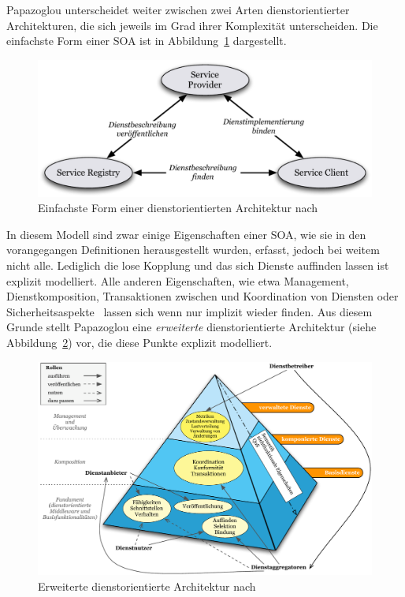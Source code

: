   Papazoglou unterscheidet weiter zwischen zwei Arten dienstorientierter Architekturen, die sich jeweils im Grad ihrer Komplexität unterscheiden. Die einfachste Form einer SOA ist in Abbildung~\ref{fig:images_Basic_SOA} dargestellt.

  \begin{figure}[!ht]
    \centering
      \includegraphics[width=.9\textwidth]{images/Basic_SOA.pdf}
    \caption{Einfachste Form einer dienstorientierten Architektur nach~\citep{service_oriented_computing}}
    \label{fig:images_Basic_SOA}
  \end{figure}

  In diesem Modell sind zwar einige Eigenschaften einer SOA, wie sie in den vorangegangen Definitionen herausgestellt wurden, erfasst, jedoch bei weitem nicht alle. Lediglich die lose Kopplung und das sich Dienste auffinden lassen ist explizit modelliert. Alle anderen Eigenschaften, wie etwa Management, Dienstkomposition, Transaktionen zwischen und Koordination von Diensten oder Sicherheitsaspekte~\cite[S. 8]{service_oriented_computing} lassen sich wenn nur implizit wieder finden. Aus diesem Grunde stellt Papazoglou eine \emph{erweiterte} dienstorientierte Architektur (siehe Abbildung~\ref{fig:images_Extended_SOA}) vor, die diese Punkte explizit modelliert.

  \begin{figure}[!ht]
    \centering
      \includegraphics[width=.9\textwidth]{images/Extended_SOA.pdf}
    \caption{Erweiterte dienstorientierte Architektur nach ~\citep{papazoglou2007soc}}
    \label{fig:images_Extended_SOA}
  \end{figure}

